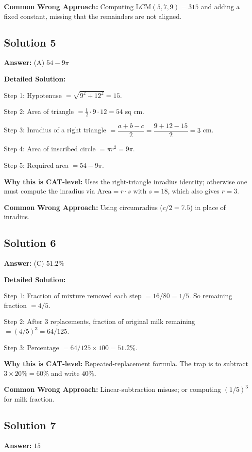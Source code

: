 \documentclass[11pt]{article}
\begin{document}
\textbf{Common Wrong Approach:}
Computing LCM\((5,7,9) = 315\) and adding a fixed constant, missing that the remainders are not aligned.

\subsection*{Solution 5}
\textbf{Answer:} (A) \(54 - 9\pi\)

\textbf{Detailed Solution:}

Step 1: Hypotenuse \(= \sqrt{9^2 + 12^2} = 15\).

Step 2: Area of triangle \(= \tfrac{1}{2}\cdot 9\cdot 12 = 54\) sq cm.

Step 3: Inradius of a right triangle \(= \dfrac{a + b - c}{2} = \dfrac{9 + 12 - 15}{2} = 3\) cm.

Step 4: Area of inscribed circle \(= \pi r^2 = 9\pi\).

Step 5: Required area \(= 54 - 9\pi\).

\textbf{Why this is CAT-level:}
Uses the right-triangle inradius identity; otherwise one must compute the inradius via \(\text{Area} = r \cdot s\) with \(s = 18\), which also gives \(r = 3\).

\textbf{Common Wrong Approach:}
Using circumradius (\(c/2 = 7.5\)) in place of inradius.

\subsection*{Solution 6}
\textbf{Answer:} (C) \(51.2\%\)

\textbf{Detailed Solution:}

Step 1: Fraction of mixture removed each step \(= 16/80 = 1/5\). So remaining fraction \(= 4/5\).

Step 2: After 3 replacements, fraction of original milk remaining \(= (4/5)^3 = 64/125\).

Step 3: Percentage \(= 64/125 \times 100 = 51.2\%\).

\textbf{Why this is CAT-level:}
Repeated-replacement formula. The trap is to subtract \(3 \times 20\% = 60\%\) and write \(40\%\).

\textbf{Common Wrong Approach:}
Linear-subtraction misuse; or computing \((1/5)^3\) for milk fraction.

\subsection*{Solution 7}
\textbf{Answer:} \(15\)
\end{document}
